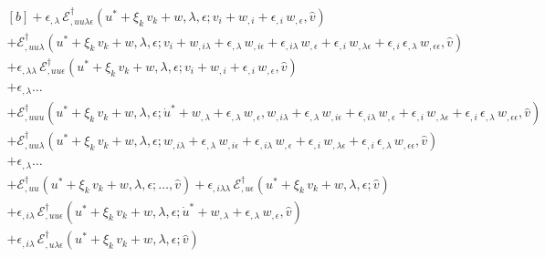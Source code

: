 \documentclass[12pt, final]{scrartcl}
\theoremstyle{definition}
\newcommand{\EE}{\mathcal E ^ \dagger}
\begin{document}
\begin{equation}
\begin{aligned}[b]
    + \epsilon_{,\lambda} \, \EE_{,uu\lambda\epsilon}(u^\ast + \xi_k \, v_k + w, \lambda, \epsilon; v_i + w_{,i} + \epsilon_{,i} \, w_{,\epsilon}, \hat{v}) &\\
    + \EE_{,uu\lambda}(u^\ast + \xi_k \, v_k + w, \lambda, \epsilon; v_i + w_{,i\lambda} + \epsilon_{,\lambda} \, w_{,i\epsilon} + \epsilon_{,i\lambda} \, w_{,\epsilon} + \epsilon_{,i} \, w_{,\lambda\epsilon}  + \epsilon_{,i} \, \epsilon_{,\lambda} \, w_{,\epsilon\epsilon}, \hat{v}) &\\
    + \epsilon_{,\lambda\lambda} \, \EE_{,uu\epsilon}(u^\ast + \xi_k \, v_k + w, \lambda, \epsilon; v_i + w_{,i} + \epsilon_{,i} \, w_{,\epsilon}, \hat{v}) &\\
    + \epsilon_{,\lambda} \ldots &\\
    + \EE_{,uuu}(u^\ast + \xi_k \, v_k + w, \lambda, \epsilon; \dot{u}^\ast + w_{,\lambda} + \epsilon_{,\lambda} \, w_{,\epsilon}, w_{,i\lambda} + \epsilon_{,\lambda} \, w_{,i\epsilon} + \epsilon_{,i\lambda} \, w_{,\epsilon} + \epsilon_{,i} \, w_{,\lambda\epsilon} + \epsilon_{,i} \, \epsilon_{,\lambda} \, w_{,\epsilon\epsilon}, \hat{v}) &\\
    + \EE_{,uu\lambda}(u^\ast + \xi_k \, v_k + w, \lambda, \epsilon; w_{,i\lambda} + \epsilon_{,\lambda} \, w_{,i\epsilon} + \epsilon_{,i\lambda} \, w_{,\epsilon} + \epsilon_{,i} \, w_{,\lambda\epsilon} + \epsilon_{,i} \, \epsilon_{,\lambda} \, w_{,\epsilon\epsilon}, \hat{v}) &\\
    + \epsilon_{,\lambda} \ldots &\\
    + \EE_{,uu}(u^\ast + \xi_k \, v_k + w, \lambda, \epsilon;\ldots, \hat{v})
    + \epsilon_{,i\lambda\lambda} \, \EE_{,u\epsilon}(u^\ast + \xi_k \, v_k + w, \lambda, \epsilon; \hat{v}) &\\
    + \epsilon_{,i\lambda} \, \EE_{,uu\epsilon}(u^\ast + \xi_k \, v_k + w, \lambda, \epsilon; \dot{u}^\ast + w_{,\lambda} + \epsilon_{,\lambda} \, w_{,\epsilon}, \hat{v}) &\\
    + \epsilon_{,i\lambda} \, \EE_{,u\lambda\epsilon}(u^\ast + \xi_k \, v_k + w, \lambda, \epsilon; \hat{v}) &\\

\end{aligned}
\end{equation}
\end{document}
